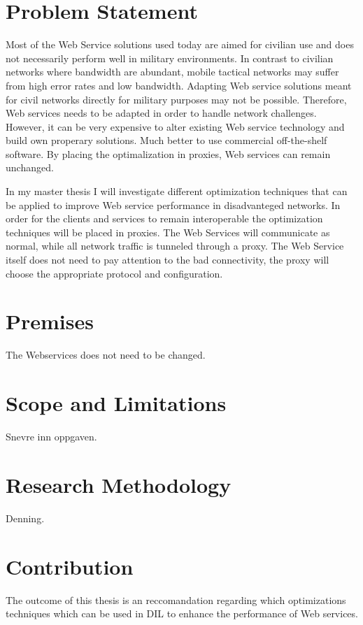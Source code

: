 \documentclass[USenglish]{article}
\begin{document}
\section{Problem Statement}
Most of the Web Service solutions used today are aimed for civilian use and does not necessarily perform well in military environments. In contrast to civilian networks where bandwidth are abundant, mobile tactical networks may suffer from high error rates and low bandwidth. Adapting Web service solutions meant for civil networks directly for military purposes may not be possible. Therefore, Web services needs to be adapted in order to handle network challenges. However, it can be very expensive to alter existing Web service technology and build own properary solutions. Much better to use commercial off-the-shelf software. By placing the optimalization in proxies, Web services can remain unchanged.

In my master thesis I will investigate different optimization techniques that can be applied to improve Web service performance in disadvanteged networks. In order for the clients and services to remain interoperable the optimization techniques will be placed in proxies. The Web Services will communicate as normal, while all network traffic is tunneled through a proxy. The Web Service itself does not need to pay attention to the bad connectivity, the proxy will choose the appropriate protocol and configuration.

\section{Premises}
The Webservices does not need to be changed. 

\section{Scope and Limitations}
Snevre inn oppgaven.

\section{Research Methodology}
Denning.

\section{Contribution}
The outcome of this thesis is an reccomandation regarding which optimizations techniques which can be used in DIL to enhance the performance of Web services.
\end{document}
